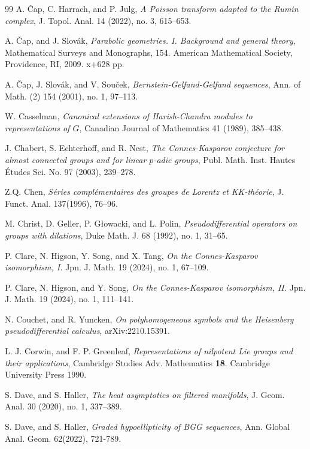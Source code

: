 \documentclass[a4paper,reqno]{amsart}
\numberwithin{equation}{section}
\theoremstyle{definition}
\theoremstyle{remark}
\begin{document}
\begin{thebibliography}{99}
 A. Čap, C. Harrach, and P. Julg, \emph{A Poisson transform adapted to the Rumin complex}, J. Topol. Anal. 14 (2022), no. 3, 615--653. 

 A. Čap, and J. Slovák, \emph{Parabolic geometries. I. Background and general theory}, Mathematical Surveys and Monographs, 154. American Mathematical Society, Providence, RI, 2009. x+628 pp.

 A. Čap, J. Slovák, and V. Souček, \emph{Bernstein-Gelfand-Gelfand sequences}, Ann. of Math. (2) 154 (2001), no. 1, 97--113.

 W. Casselman, \emph{Canonical extensions of Harish-Chandra modules to representations of $G$}, Canadian Journal of Mathematics 41 (1989), 385--438.

 J. Chabert, S. Echterhoff, and R. Nest, \emph{The Connes-Kasparov conjecture for almost connected groups and for linear $p$-adic groups}, Publ. Math. Inst. Hautes Études Sci. No. 97 (2003), 239--278.

 Z.Q. Chen, \emph{Séries complémentaires des groupes de Lorentz et KK-théorie}, J. Funct. Anal. 137(1996), 76--96.

 M. Christ, D. Geller, P. Głowacki, and L. Polin, \emph{Pseudodifferential operators on groups with dilations}, Duke Math. J. 68 (1992), no. 1, 31--65.

 P. Clare, N. Higson, Y. Song, and X. Tang, \emph{On the Connes-Kasparov isomorphism, I.} Jpn. J. Math. 19 (2024), no. 1, 67--109.

 P. Clare, N. Higson, and Y. Song, \emph{On the Connes-Kasparov isomorphism, II.} Jpn. J. Math. 19 (2024), no. 1, 111--141.

 N. Couchet, and R. Yuncken, \emph{On polyhomogeneous symbols and the Heisenberg pseudodifferential calculus}, arXiv:2210.15391.

  L. J. Corwin, and F. P. Greenleaf, \emph{Representations of nilpotent Lie groups and their applications}, Cambridge Studies Adv. Mathematics \textbf{18}. Cambridge University Press 1990.

 S. Dave, and S. Haller, \emph{The heat asymptotics on filtered manifolds}, J. Geom. Anal. 30 (2020), no. 1, 337--389.

 S. Dave, and S. Haller, \emph{Graded hypoellipticity of BGG sequences},  Ann. Global Anal. Geom. 62(2022), 721-789.


\end{thebibliography}
\end{document}
